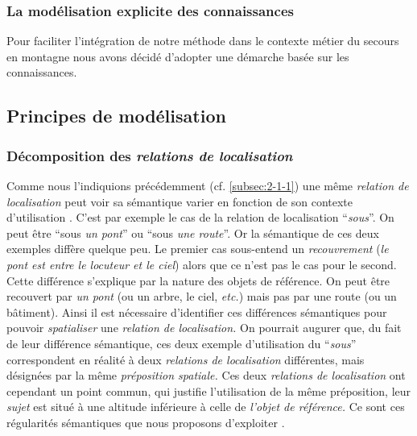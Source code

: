 \subsubsection{La modélisation explicite des connaissances}

Pour faciliter l'intégration de notre méthode dans le contexte métier
du secours en montagne nous avons décidé d'adopter une démarche basée
sur les connaissances.

\subsection{Principes de modélisation}

\subsubsection{Décomposition des \emph{relations de localisation}}

Comme nous l'indiquions précédemment (cf. \ref{subsec:2-1-1}) une même
\emph{relation de localisation} peut voir sa sémantique varier en
fonction de son contexte d'utilisation \autocite[16]{Borillo1998}.
C'est par exemple le cas de la relation de localisation
\enquote{\emph{sous}}. On peut être \enquote{sous \emph{un pont}} ou
\enquote{sous \emph{une route}}. Or la sémantique de ces deux exemples
diffère quelque peu. Le premier cas sous-entend un \emph{recouvrement}
(\ie \emph{le pont est entre le locuteur et le ciel}) alors que ce
n'est pas le cas pour le second. Cette différence s'explique par la
nature des objets de référence. On peut être recouvert par \emph{un
  pont} (ou un arbre, le ciel, \emph{etc.})  mais pas par une route
(ou un bâtiment). Ainsi il est nécessaire d'identifier ces différences
sémantiques pour pouvoir \emph{spatialiser} une \emph{relation de
  localisation.}
%
On pourrait augurer que, du fait de leur différence sémantique, ces
deux exemple d'utilisation du \enquote{\emph{sous}} correspondent en
réalité à deux \emph{relations de localisation} différentes, mais
désignées par la même \emph{préposition spatiale.}
%
Ces deux \emph{relations de localisation} ont cependant un point
commun, qui justifie l'utilisation de la même préposition, leur
\emph{sujet} est situé à une altitude inférieure à celle de
\emph{l'objet de référence.} Ce sont ces régularités sémantiques que
nous proposons d'exploiter \autocite{Bunel2019a}.

